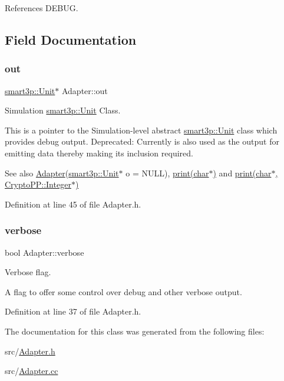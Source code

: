 References D\+E\+B\+UG.



\subsection{Field Documentation}
\mbox{\label{classAdapter_abdeff6c9fdf71ac88a56318fa7aea4c4}} 
\subsubsection{\texorpdfstring{out}{out}}
{\footnotesize\ttfamily \hyperlink{classsmart3p_1_1Unit}{smart3p\+::\+Unit}$\ast$ Adapter\+::out\hspace{0.3cm}{\ttfamily [protected]}}



Simulation \hyperlink{classsmart3p_1_1Unit}{smart3p\+::\+Unit} Class. 

This is a pointer to the Simulation-\/level abstract \hyperlink{classsmart3p_1_1Unit}{smart3p\+::\+Unit} class which provides debug output. Deprecated\+: Currently is also used as the output for emitting data thereby making its inclusion required. \begin{DoxySeeAlso}{See also}
\hyperlink{classAdapter}{Adapter}(\hyperlink{classsmart3p_1_1Unit}{smart3p\+::\+Unit}$\ast$ o = N\+U\+LL), \hyperlink{classAdapter_af928c4508bc6a76e8f9b918d38ffd221}{print(char$\ast$)} and \hyperlink{classAdapter_a411c5677216438c68fc06f29909bf124}{print(char$\ast$, Crypto\+P\+P\+::\+Integer$\ast$)} 
\end{DoxySeeAlso}


Definition at line 45 of file Adapter.\+h.

\mbox{\label{classAdapter_a49cad2fc1742424ec9f28caaa30f489f}} 
\subsubsection{\texorpdfstring{verbose}{verbose}}
{\footnotesize\ttfamily bool Adapter\+::verbose\hspace{0.3cm}{\ttfamily [protected]}}



Verbose flag. 

A flag to offer some control over debug and other verbose output. 

Definition at line 37 of file Adapter.\+h.



The documentation for this class was generated from the following files\+:\begin{DoxyCompactItemize}
\item 
src/\hyperlink{Adapter_8h}{Adapter.\+h}\item 
src/\hyperlink{Adapter_8cc}{Adapter.\+cc}\end{DoxyCompactItemize}
